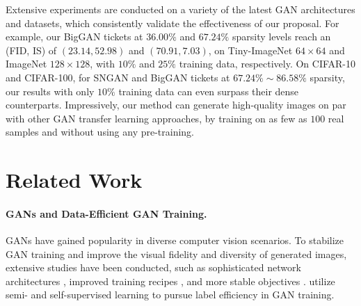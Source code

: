 \documentclass{article}
\newcommand{\TL}[1]{\textcolor{Tianlong_color}{TL:#1}}
\begin{document}

Extensive experiments are conducted on a variety of the latest GAN architectures and datasets, which consistently validate the effectiveness of our proposal. For example, our BigGAN tickets at $36.00\%$ and $67.24\%$ sparsity levels reach an (FID, IS) of $(23.14,52.98)$ and $(70.91,7.03)$, on Tiny-ImageNet $64\times64$ and ImageNet $128\times128$, with $10\%$ and $25\%$ training data, respectively. On CIFAR-10 and CIFAR-100, for SNGAN and BigGAN tickets at $67.24\%\sim86.58\%$ sparsity, our results with only $10\%$ training data can even surpass their dense counterparts. Impressively, our method can generate high-quality images on par with other GAN transfer learning approaches, by training on as few as $100$ real samples and without using any pre-training.

\vspace{-0.5em}
\section{Related Work}
\vspace{-2mm}
\paragraph{GANs and Data-Efficient GAN Training.} GANs \cite{gui2020review} have gained popularity in diverse computer vision scenarios. To stabilize GAN training and improve the visual fidelity and diversity of generated images, extensive studies have been conducted, such as sophisticated network architectures \cite{miyato2018spectral,MiyatoK18,radford2015unsupervised,zhang2019self,chen2020distilling}, improved training recipes \cite{denton2015deep,karras2017progressive,liu2020diverse,zhang2017stackgan}, and more stable objectives \cite{arjovsky2017wasserstein,gulrajani2017improved,mmdgan,mescheder2018training,salimans2016improved,guo2020positive}. \cite{chen2019self,lucic2019high} utilize semi- and self-supervised learning to pursue label efficiency in GAN training. 
\end{document}
